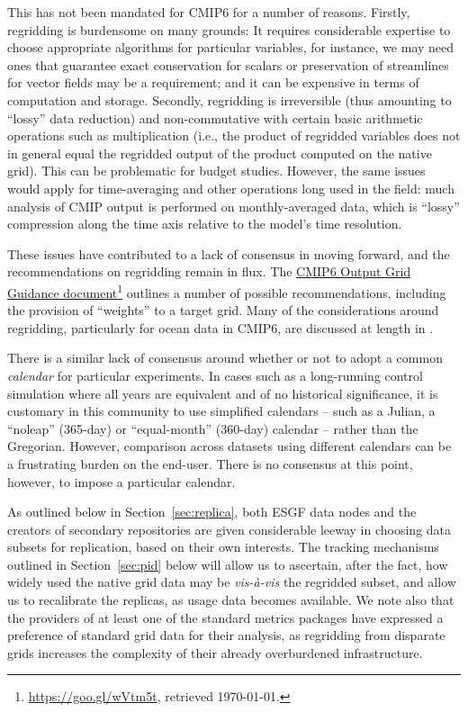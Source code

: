\documentclass[gmd,manuscript]{copernicus}
\newcommand{\urlref}[2] {\href{#1}{#2}\footnote{\url{#1}, retrieved \today.}}
\begin{document}
This has not been mandated for CMIP6 for a number of reasons. Firstly,
regridding is burdensome on many grounds: It requires considerable
expertise to choose appropriate algorithms for particular variables,
for instance, we may need ones that guarantee exact conservation for
scalars or preservation of streamlines for vector fields may be a
requirement; and it can be expensive in terms of computation and
storage. Secondly, regridding is irreversible (thus amounting to
``lossy'' data reduction) and non-commutative with certain basic
arithmetic operations such as multiplication (i.e., the product of
regridded variables does not in general equal the regridded output of
the product computed on the native grid). This can be problematic for
budget studies. However, the same issues would apply for
time-averaging and other operations long used in the field: much
analysis of CMIP output is performed on monthly-averaged data, which
is ``lossy'' compression along the time axis relative to the model's
time resolution.

These issues have contributed to a lack of consensus in moving forward,
and the recommendations on regridding remain in flux. The
\urlref{https://goo.gl/wVtm5t}{CMIP6 Output Grid Guidance document}
outlines a number of possible recommendations, including the provision
of ``weights'' to a target grid. Many of the considerations around
regridding, particularly for ocean data in CMIP6, are discussed at
length in \cite{ref:griffiesetal2016}. 

There is a similar lack of consensus around whether or not to adopt a common \emph{calendar} for
particular experiments.
In cases such as a long-running control simulation where all years are
equivalent and of no historical significance, it is customary in this
community to use simplified calendars -- such as a Julian, a
``noleap'' (365-day) or ``equal-month'' (360-day) calendar -- rather
than the Gregorian. However,
comparison across datasets using different calendars can be a
frustrating burden on the end-user. There is no consensus at this
point, however, to impose a particular calendar.

As outlined below in Section~\ref{sec:replica}, both ESGF data nodes
and the creators of secondary repositories are given considerable
leeway in choosing data subsets for replication, based on their own
interests. The tracking mechanisms outlined in Section~\ref{sec:pid}
below will allow us to ascertain, after the fact, how widely used the
native grid data may be \emph{vis-\`a-vis} the regridded subset, and
allow us to recalibrate the replicas, as usage data becomes available.
We note also that the providers of at least one of the standard
metrics packages \citep[ESMValTool,][]{ref:eyringetal2016a} have
expressed a preference of standard grid data for their analysis, as
regridding from disparate grids increases the complexity of their
already overburdened infrastructure.
\end{document}
